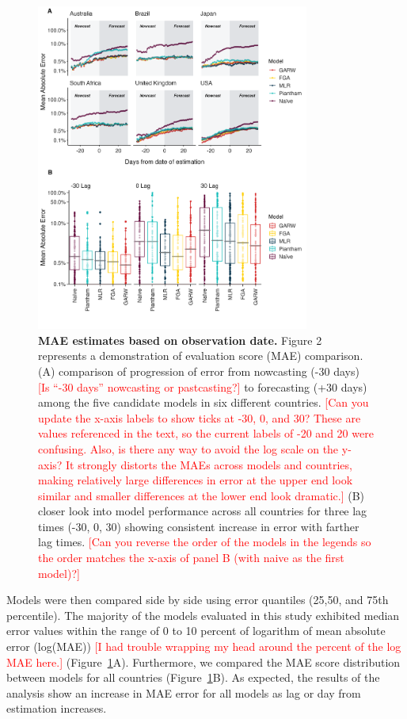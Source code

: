 \documentclass[11pt,oneside,letterpaper]{article}
\def\jhc#1{\textcolor{red}{[#1]}}
\begin{document}
\begin{figure}[H]
	\centering
	\includegraphics[width=0.8\textwidth]{figures/model_comp.png}
	\caption{\textbf{MAE estimates based on observation date.}
	Figure 2 represents a demonstration of evaluation score (MAE) comparison.
	(A) comparison of progression of error from nowcasting (-30 days) \jhc{Is ``-30 days'' nowcasting or pastcasting?} to forecasting (+30 days) among the five candidate models in six different countries.
    \jhc{Can you update the x-axis labels to show ticks at -30, 0, and 30? These are values referenced in the text, so the current labels of -20 and 20 were confusing. Also, is there any way to avoid the log scale on the y-axis? It strongly distorts the MAEs across models and countries, making relatively large differences in error at the upper end look similar and smaller differences at the lower end look dramatic.}
	(B) closer look into model performance across all countries for three lag times (-30, 0, 30) showing consistent increase in error with farther lag times.
    \jhc{Can you reverse the order of the models in the legends so the order matches the x-axis of panel B (with naive as the first model)?}
	}
	\label{fig:model_comp_fig}
\end{figure}


Models were then compared side by side using error quantiles (25,50, and 75th percentile).
The majority of the models evaluated in this study exhibited median error values within the range of 0 to 10 percent of logarithm of mean absolute error (log(MAE)) \jhc{I had trouble wrapping my head around the percent of the log MAE here.} (Figure~\ref{fig:model_comp_fig}A).
Furthermore, we compared the MAE score distribution between models for all countries (Figure~\ref{fig:model_comp_fig}B).
As expected, the results of the analysis show an increase in MAE error for all models as lag or day from estimation increases.
\end{document}
